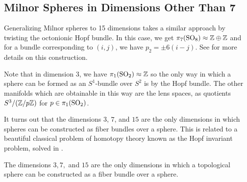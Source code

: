\subsection{Milnor Spheres in Dimensions Other Than 7}

Generalizing Milnor spheres to 15 dimensions takes a similar approach by twisting the octonionic Hopf bundle. In this case, we get $\pi_7(\mathrm{SO}_8)\approx \mathbb{Z}\oplus \mathbb{Z}$ and for a bundle corresponding to $(i,j)$, we have $p_2=\pm 6(i-j)$. See \cite{shimada1957differentiable} for more details on this construction. 

\begin{remark*}
	Note that in dimension $3$, we have $\pi_1(\mathrm{SO}_2)\approx \mathbb{Z}$ so the only way in which a sphere can be formed as an $S^1$-bundle over $S^2$ is by the Hopf bundle. The other manifolds which are obtainable in this way are the lens spaces, as quotients $S^3/(\mathbb{Z}/p\mathbb{Z})$ for $p\in \pi_1(\mathrm{SO}_2)$.
\end{remark*}

It turns out that the dimensions $3$, $7$, and $15$ are the only dimensions in which spheres can be constructed as fiber bundles over a sphere. This is related to a beautiful classical problem of homotopy theory known as the Hopf invariant problem, solved in \cite{adams1960}.

\begin{theorem}\label{thm:hopf-homotopy-spheres}
	The dimensions $3, 7,$ and $15$ are the only dimensions in which a topological sphere can be constructed as a fiber bundle over a sphere.
\end{theorem}

\smallrule
